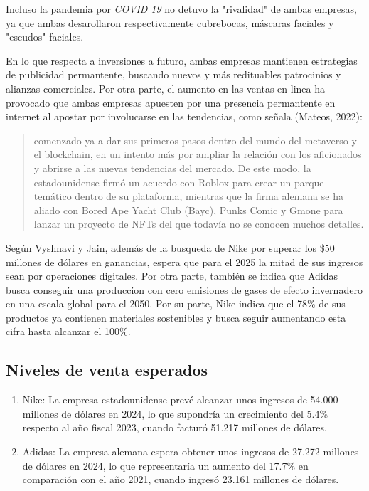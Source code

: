 \documentclass[a4paper,12pt]{article}
\begin{document}
Incluso la pandemia por \emph{COVID 19} no detuvo la "rivalidad" de ambas empresas, ya que ambas desarollaron respectivamente cubrebocas, máscaras faciales y "escudos" faciales.\par

En lo que respecta a inversiones a futuro, ambas empresas mantienen estrategias de publicidad permantente, buscando nuevos y más redituables patrocinios y alianzas comerciales. Por otra parte, el aumento en las ventas en linea ha provocado que ambas empresas apuesten por una presencia permantente en internet al apostar por involucarse en las tendencias, como señala (Mateos, 2022):
\begin{quote}
	comenzado ya a dar sus primeros pasos dentro del mundo del metaverso y el blockchain, en un intento más por ampliar la relación con los aficionados y abrirse a las nuevas tendencias del mercado. De este modo, la estadounidense firmó un acuerdo con Roblox para crear un parque temático dentro de su plataforma, mientras que la firma alemana se ha aliado con Bored Ape Yacht Club (Bayc), Punks Comic y Gmone para lanzar un proyecto de NFTs del que todavía no se conocen muchos detalles. 
\end{quote}

Según Vyshnavi y Jain, además de la busqueda de Nike por superar los \$50 millones de dólares en ganancias, espera que para el 2025 la mitad de sus ingresos sean por operaciones digitales. Por otra parte, también se indica que Adidas busca conseguir una produccion con cero emisiones de gases de efecto invernadero en una escala global para el 2050. Por su parte, Nike indica que el 78\% de sus productos ya contienen materiales sostenibles y busca seguir aumentando esta cifra hasta alcanzar el 100\%. \par


\subsection{Niveles de venta esperados}

\begin{enumerate}
	\item Nike: La empresa estadounidense prevé alcanzar unos ingresos de 54.000 millones de dólares en 2024, lo que supondría un crecimiento del 5.4\% respecto al año fiscal 2023, cuando facturó 51.217 millones de dólares.
	\item Adidas: La empresa alemana espera obtener unos ingresos de 27.272 millones de dólares en 2024, lo que representaría un aumento del 17.7\% en comparación con el año 2021, cuando ingresó 23.161 millones de dólares.

\end{enumerate}
\end{document}
